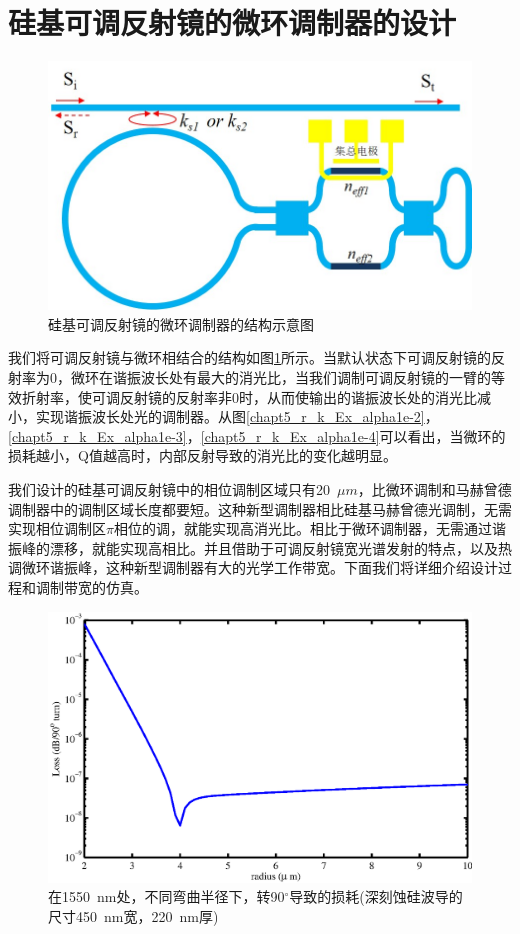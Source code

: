 \section{硅基可调反射镜的微环调制器的设计}
\begin{figure}[htb]
	\centering
	\includegraphics[width=12cm]{./Pictures/chapt5_tunable_reflection_ring_structure.jpg}
	\caption{硅基可调反射镜的微环调制器的结构示意图}
	\label{chapt5_tunable_reflection_ring_structure}
\end{figure}
我们将可调反射镜与微环相结合的结构如图\ref{chapt5_tunable_reflection_ring_structure}所示。当默认状态下可调反射镜的反射率为0，微环在谐振波长处有最大的消光比，当我们调制可调反射镜的一臂的等效折射率，使可调反射镜的反射率非0时，从而使输出的谐振波长处的消光比减小，实现谐振波长处光的调制器。从图\ref{chapt5_r_k_Ex_alpha1e-2}，\ref{chapt5_r_k_Ex_alpha1e-3}，\ref{chapt5_r_k_Ex_alpha1e-4}可以看出，当微环的损耗越小，Q值越高时，内部反射导致的消光比的变化越明显。

我们设计的硅基可调反射镜中的相位调制区域只有20~$\mu m$，比微环调制和马赫曾德调制器中的调制区域长度都要短。这种新型调制器相比硅基马赫曾德光调制，无需实现相位调制区$\pi$相位的调，就能实现高消光比。相比于微环调制器，无需通过谐振峰的漂移，就能实现高相比。并且借助于可调反射镜宽光谱发射的特点，以及热调微环谐振峰，这种新型调制器有大的光学工作带宽。下面我们将详细介绍设计过程和调制带宽的仿真。

\begin{figure}[htb]
	\centering
	\includegraphics[width=12cm]{./Pictures/chapt5_deep_si_bend_loss.eps}
	\caption{在1550~nm处，不同弯曲半径下，转90$^\circ$导致的损耗(深刻蚀硅波导的尺寸450~nm宽，220~nm厚)}
	\label{chapt5_deep_si_bend_loss}
\end{figure}

